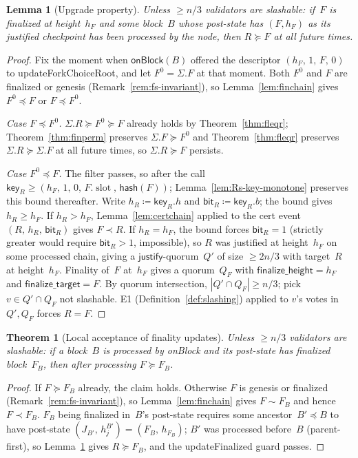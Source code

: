 \ifx\litemode\undefined\documentclass{article}\fi
\newcommand{\slot}[0]{\ensuremath{\operatorname{\mathrm{slot}}}}
\newcommand{\just}{\ensuremath{\mathsf{justify}}\xspace}
\newcommand{\finalizeHeight}{\mathsf{finalize\_height}}
\newcommand{\finalizeTarget}{\mathsf{finalize\_target}}
\newcommand{\hash}{\mathsf{hash}}
\newcommand{\key}{\mathsf{key}}
\newcommand{\bit}{\mathsf{bit}}
\newcommand{\onBlock}{\textsf{onBlock}\xspace}
\newcommand{\updateForkChoiceRoot}{\textsf{updateForkChoiceRoot}\xspace}
\newcommand{\updateFinalized}{\textsf{updateFinalized}\xspace}
\theoremstyle{plain}
\newtheorem{theorem}{Theorem}
\newtheorem{lemma}{Lemma}
\theoremstyle{definition}
\theoremstyle{remark}
\begin{document}
\begin{lemma}[Upgrade property]\label{lem:upgrade}
Unless $\geq n/3$ validators are slashable: if~$F$ is finalized at height~$h_F$ and some block~$B$ whose post-state has $(F, h_F)$ as its justified checkpoint has been processed by the node, then $R \succeq F$ at all future times.
\end{lemma}

\begin{proof}
Fix the moment when $\onBlock(B)$ offered the descriptor $(h_F,\, 1,\, F,\, 0)$ to \updateForkChoiceRoot, and let $F^0 = \Sigma.F$ at that moment.
Both $F^0$ and $F$ are finalized or genesis (Remark~\ref{rem:fs-invariant}), so Lemma~\ref{lem:finchain} gives $F^0 \preceq F$ or $F \preceq F^0$.

\emph{Case $F \preceq F^0$.}
$\Sigma.R \succeq F^0 \succeq F$ already holds by Theorem~\ref{thm:fleqr}; Theorem~\ref{thm:finperm} preserves $\Sigma.F \succeq F^0$ and Theorem~\ref{thm:fleqr} preserves $\Sigma.R \succeq \Sigma.F$ at all future times, so $\Sigma.R \succeq F$ persists.

\emph{Case $F^0 \preceq F$.}
The filter passes, so after the call $\key_R \geq (h_F,\, 1,\, 0,\, F.\slot,\, \hash(F))$; Lemma~\ref{lem:Rs-key-monotone} preserves this bound thereafter.
Write $h_R \coloneqq \key_R.h$ and $\bit_R \coloneqq \key_R.b$; the bound gives $h_R \geq h_F$.
If $h_R > h_F$, Lemma~\ref{lem:certchain} applied to the cert event $(R,\, h_R,\, \bit_R)$ gives $F \prec R$.
If $h_R = h_F$, the bound forces $\bit_R = 1$ (strictly greater would require $\bit_R > 1$, impossible), so $R$ was justified at height~$h_F$ on some processed chain, giving a \just-quorum~$Q'$ of size $\geq 2n/3$ with target~$R$ at height~$h_F$.
Finality of~$F$ at~$h_F$ gives a quorum~$Q_F$ with $\finalizeHeight = h_F$ and $\finalizeTarget = F$.
By quorum intersection, $|Q' \cap Q_F| \geq n/3$; pick $v \in Q' \cap Q_F$ not slashable.
E1 (Definition~\ref{def:slashing}) applied to $v$'s votes in~$Q', Q_F$ forces $R = F$.
\end{proof}

\begin{theorem}[Local acceptance of finality updates]\label{thm:finlive}
Unless $\geq n/3$ validators are slashable: if a block~$B$ is processed by \onBlock and its post-state has finalized block~$F_B$, then after processing $F \succeq F_B$.
\end{theorem}

\begin{proof}
If $F \succeq F_B$ already, the claim holds.
Otherwise $F$ is genesis or finalized (Remark~\ref{rem:fs-invariant}), so Lemma~\ref{lem:finchain} gives $F \sim F_B$ and hence $F \prec F_B$.
$F_B$ being finalized in~$B$'s post-state requires some ancestor~$B' \preceq B$ to have post-state $(J_{B'},\, h_j^{B'}) = (F_B,\, h_{F_B})$; $B'$ was processed before~$B$ (parent-first), so Lemma~\ref{lem:upgrade} gives $R \succeq F_B$, and the \updateFinalized guard passes.
\end{proof}
\end{document}
